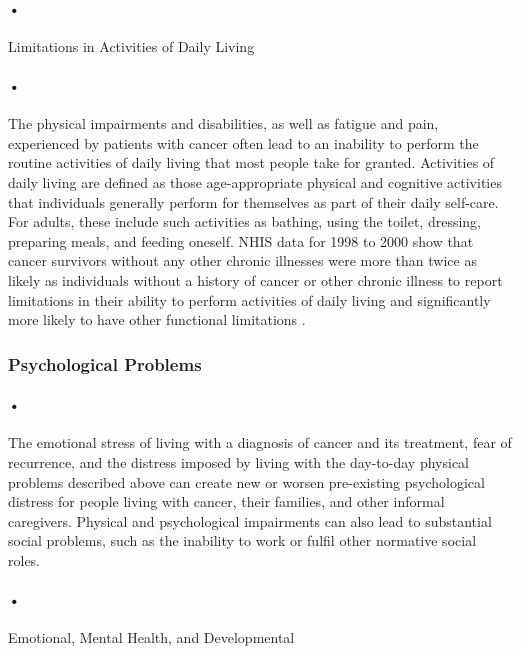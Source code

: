 \documentclass[12pt]{article}
\begin{document}
\paragraph{•}Limitations in Activities of Daily Living

\paragraph{•}The physical impairments and disabilities, as well as fatigue and pain, experienced by patients with cancer often lead to an inability to perform the routine activities of daily living that most people take for granted. Activities of daily living are defined as those age-appropriate physical and cognitive activities that individuals generally perform for themselves as part of their daily self-care. For adults, these include such activities as bathing, using the toilet, dressing, preparing meals, and feeding oneself. NHIS data for 1998 to 2000 show that cancer survivors without any other chronic illnesses were more than twice as likely as individuals without a history of cancer or other chronic illness to report limitations in their ability to perform activities of daily living and significantly more likely to have other functional limitations \cite{Hewitt}. 

\subsubsection{Psychological Problems}
\paragraph{•}The emotional stress of living with a diagnosis of cancer and its treatment, fear of recurrence, and the distress imposed by living with the day-to-day physical problems described above can create new or worsen pre-existing psychological distress for people living with cancer, their families, and other informal caregivers. Physical and psychological impairments can also lead to substantial social problems, such as the inability to work or fulfil other normative social roles.

\paragraph{•}Emotional, Mental Health, and Developmental
\end{document}
